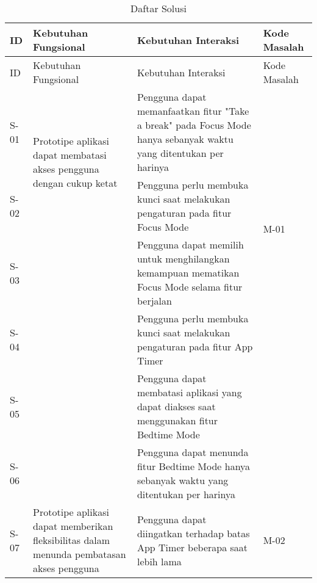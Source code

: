 \begin{longtable}[c]{|p{}|p{}|p{}|p{}|}
  \caption{Daftar Solusi}
  \label{tab:daftar_solusi} \\
  
  \hline
  ID  & Kebutuhan Fungsional & Kebutuhan Interaksi & Kode Masalah \\ \hline \endfirsthead

  \hline
  ID  & Kebutuhan Fungsional & Kebutuhan Interaksi & Kode Masalah \\ \hline \endhead

  \hline \endfoot

  S-01
  & \multirow{2}{0.3\textwidth}{Prototipe aplikasi dapat membatasi akses pengguna dengan cukup ketat}
  & Pengguna dapat memanfaatkan fitur "Take a break" pada Focus Mode hanya sebanyak waktu yang ditentukan per harinya
  & \multirow{4}{0.1\textwidth}{M-01} \\ \cline{1-1} \cline{3-3}
  
  S-02 &  
  & Pengguna perlu membuka kunci saat melakukan pengaturan pada fitur Focus Mode
  & \\ \cline{1-1} \cline{3-3}
  
  S-03 &  
  & Pengguna dapat memilih untuk menghilangkan kemampuan mematikan Focus Mode selama fitur berjalan
  & \\ \cline{1-1} \cline{3-3}
  
  S-04 &  
  & Pengguna perlu membuka kunci saat melakukan pengaturan pada fitur App Timer
  & \\ \cline{1-1} \cline{3-3}
  
  S-05 &  
  & Pengguna dapat membatasi aplikasi yang dapat diakses saat menggunakan fitur Bedtime Mode
  & \\ \cline{1-1} \cline{3-3}
  
  S-06 &  
  & Pengguna dapat menunda fitur Bedtime Mode hanya sebanyak waktu yang ditentukan per harinya
  
  & \\ \hline
  S-07
  & \multirow{3}{0.3\textwidth}{Prototipe aplikasi dapat memberikan fleksibilitas dalam menunda pembatasan akses pengguna}
  & Pengguna dapat diingatkan terhadap batas App Timer beberapa saat lebih lama
  & \multirow{2}{0.1\textwidth}{M-02} \\ \cline{1-1} \cline{3-3}
  

\end{longtable}
